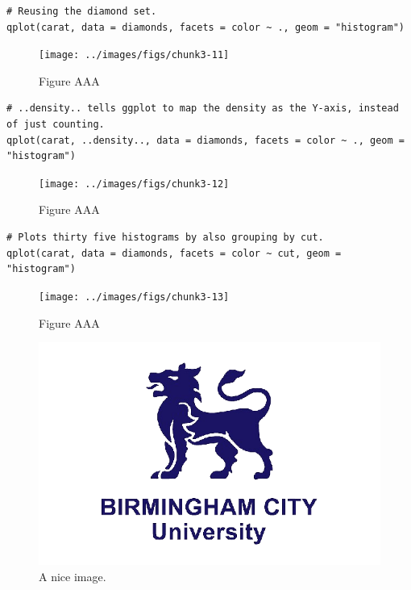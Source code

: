 \begin{verbatim}
# Reusing the diamond set.
qplot(carat, data = diamonds, facets = color ~ ., geom = "histogram")
\end{verbatim}

\begin{figure}[H]

{\centering \texttt{[image: ../images/figs/chunk3-11]} 

}

\caption{Figure AAA}\label{fig:chunk3-11}
\end{figure}

\begin{verbatim}
# ..density.. tells ggplot to map the density as the Y-axis, instead of just counting.
qplot(carat, ..density.., data = diamonds, facets = color ~ ., geom = "histogram")
\end{verbatim}

\begin{figure}[H]

{\centering \texttt{[image: ../images/figs/chunk3-12]} 

}

\caption{Figure AAA}\label{fig:chunk3-12}
\end{figure}

\begin{verbatim}
# Plots thirty five histograms by also grouping by cut.
qplot(carat, data = diamonds, facets = color ~ cut, geom = "histogram")
\end{verbatim}

\begin{figure}[H]

{\centering \texttt{[image: ../images/figs/chunk3-13]} 

}

\caption{Figure AAA}\label{fig:chunk3-13}
\end{figure}
\begin{figure}
\includegraphics[width=0.5\linewidth]{../images/bcu logo} \caption{A nice image.}\label{fig:unnamed-chunk-2}
\end{figure}
